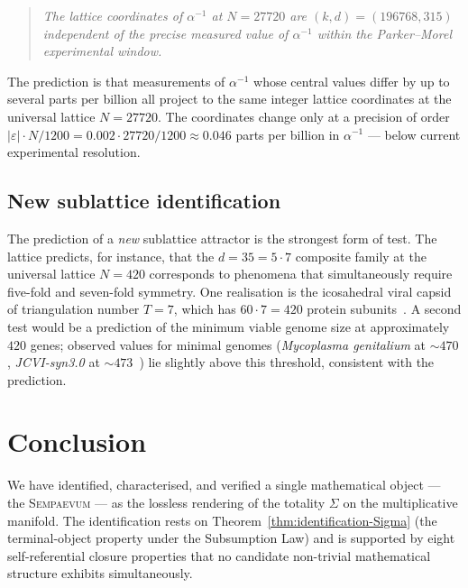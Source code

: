\documentclass[11pt,a4paper]{article}
\theoremstyle{definition}
\theoremstyle{remark}
\newcommand{\eps}{\varepsilon}
\newcommand{\Sempaevum}{\textsc{Sempaevum}}
\begin{document}
\begin{quote}\itshape
The lattice coordinates of $\alpha^{-1}$ at $N=27720$ are $(k,d)=(196768,315)$ independent of the precise measured value of $\alpha^{-1}$ within the Parker--Morel experimental window.
\end{quote}

The prediction is that measurements of $\alpha^{-1}$ whose central values differ by up to several parts per billion all project to the same integer lattice coordinates at the universal lattice $N=27720$. The coordinates change only at a precision of order $|\eps|\cdot N/1200 = 0.002\cdot 27720/1200 \approx 0.046$ parts per billion in $\alpha^{-1}$ --- below current experimental resolution.

\subsection{New sublattice identification}

The prediction of a \emph{new} sublattice attractor is the strongest form of test. The lattice predicts, for instance, that the $d=35 = 5\cdot 7$ composite family at the universal lattice $N=420$ corresponds to phenomena that simultaneously require five-fold and seven-fold symmetry. One realisation is the icosahedral viral capsid of triangulation number $T=7$, which has $60\cdot 7 = 420$ protein subunits~\cite{CasparKlug}. A second test would be a prediction of the minimum viable genome size at approximately $420$ genes; observed values for minimal genomes (\emph{Mycoplasma genitalium} at $\sim 470$, \emph{JCVI-syn3.0} at $\sim 473$~\cite{Hutchison2016}) lie slightly above this threshold, consistent with the prediction.

\section{Conclusion}\label{sec:conclusion}

We have identified, characterised, and verified a single mathematical object --- the \Sempaevum{} --- as the lossless rendering of the totality $\Sigma$ on the multiplicative manifold. The identification rests on Theorem~\ref{thm:identification-Sigma} (the terminal-object property under the Subsumption Law) and is supported by eight self-referential closure properties that no candidate non-trivial mathematical structure exhibits simultaneously.
\end{document}
